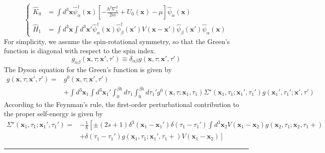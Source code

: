 \begin{equation}
\left\{
\begin{aligned}
\hat{K}_0&=\int d^3 \mathbf{x} \hat{\psi}_\alpha^\dagger(\mathbf{x}) \left[-\frac{\hbar^2\nabla_x^2}{2m}+U_0(\mathbf{x})-\mu\right] \hat{\psi}_\alpha(\mathbf{x})\\
\hat{H}_1&=\int d^3 \mathbf{x} \int d^3 \mathbf{x}' \hat{\psi}_\alpha^\dagger(\mathbf{x}) \hat{\psi}_\beta^\dagger(\mathbf{x}') V(\mathbf{x}-\mathbf{x}') \hat{\psi}_\beta(\mathbf{x}')\hat{\psi}_\alpha(\mathbf{x})
\end{aligned}
\right.
\end{equation}
For simplicity, we assume the spin-rotational symmetry, so that the Green's function is diagonal with respect to the spin index.
\begin{equation}
g_{\alpha\beta}(\mathbf{x},\tau;\mathbf{x}',\tau')\equiv\delta_{\alpha\beta}g(\mathbf{x},\tau;\mathbf{x}',\tau')
\end{equation}
The Dyson equation for the Green's function is given by
\begin{equation}
\begin{aligned}
g(\mathbf{x},\tau;\mathbf{x}',\tau')=&g^0(\mathbf{x},\tau;\mathbf{x}',\tau')\\&+\int d^3 \mathbf{x}_1 \int d^3 \mathbf{x}_1' \int_0^{\beta\hbar}d\tau_1 \int_0^{\beta\hbar}d\tau_1' g^0(\mathbf{x},\tau;\mathbf{x}_1,\tau_1) \Sigma^\star(\mathbf{x}_1,\tau_1;\mathbf{x}_1',\tau_1') g(\mathbf{x}_1',\tau_1';\mathbf{x}',\tau')
\end{aligned}
\end{equation}
According to the Feynman's rule, the first-order perturbational contribution to the proper self-energy is given by
\begin{equation}
\begin{aligned}
\Sigma^\star(\mathbf{x}_1,\tau_1;\mathbf{x}_1',\tau_1')=&-\frac{1}{\hbar}\left[\pm(2s+1)\delta^3(\mathbf{x}_1-\mathbf{x}_1')\delta(\tau_1-\tau_1')\int d^3 \mathbf{x}_2 V(\mathbf{x}_1-\mathbf{x}_2) g(\mathbf{x}_2,\tau_1;\mathbf{x}_2,\tau_1+)\right.\\
&\left.+\delta(\tau_1-\tau_1') g(\mathbf{x}_1,\tau_1;\mathbf{x}_1',\tau_1+) V(\mathbf{x}_1-\mathbf{x}_2)\right]
\end{aligned}
\end{equation}
\rule{\textwidth}{1mm}
